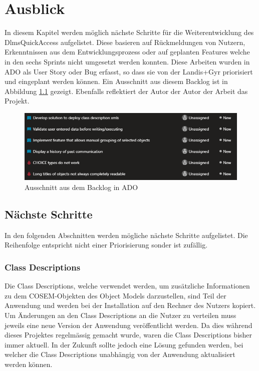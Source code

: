 
\chapter{Ausblick}\label{ausblick}
In diesem Kapitel werden möglich nächste Schritte für die Weiterentwicklung des DlmsQuickAccess aufgelistet.
Diese basieren auf  Rückmeldungen von Nutzern, Erkenntnissen aus dem Entwicklungsprozess oder auf geplanten Features welche in den sechs Sprints nicht umgesetzt werden konnten.  
Diese Arbeiten wurden in \ac{ADO} als User Story oder Bug erfasst, so dass sie von der Landis+Gyr priorisiert und eingeplant werden können.
Ein Ausschnitt aus diesem Backlog ist in Abbildung \ref{fig:ADOBacklog} gezeigt.
Ebenfalls reflektiert der Autor der Autor der Arbeit das Projekt.
\begin{figure}[H]
   \centering
   \includegraphics[width=1.0\textwidth]{gfx/ADOBacklog.png}
   \caption{
      Ausschnitt aus dem Backlog in \ac{ADO}
      }
   \label{fig:ADOBacklog}
\end{figure}


\section{Nächste Schritte}\label{nextSteps}
In den folgenden Abschnitten werden mögliche nächste Schritte aufgelistet.
Die Reihenfolge entspricht nicht einer Priorisierung sonder ist zufällig.

\subsection{Class Descriptions}
Die Class Descriptions, welche verwendet werden, um zusätzliche Informationen zu dem \ac{COSEM}-Objekten des Object Models darzustellen, sind Teil der Anwendung und werden bei der Installation auf den Rechner des Nutzers kopiert.
Um Änderungen an den Class Descriptions an die Nutzer zu verteilen muss jeweils eine neue Version der Anwendung veröffentlicht werden.
Da dies während dieses Projektes regelmässig gemacht wurde, waren die Class Descriptions bisher immer aktuell.
In der Zukunft sollte jedoch eine Lösung gefunden werden, bei welcher die Class Descriptions unabhängig von der Anwendung aktualisiert werden können.

